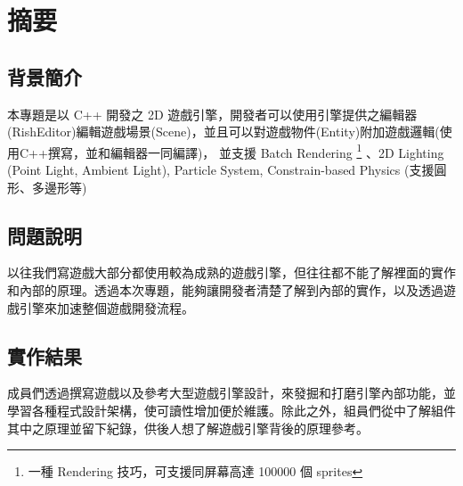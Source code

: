 \chapter{摘要}

\section{背景簡介}

本專題是以 C++ 開發之 2D 遊戲引擎，開發者可以使用引擎提供之編輯器(RishEditor)編輯遊戲場景(Scene)，並且可以對遊戲物件(Entity)附加遊戲邏輯(使用C++撰寫，並和編輯器一同編譯)，
並支援 Batch Rendering \footnote{一種 Rendering 技巧，可支援同屏幕高達 100000 個 sprites} 、2D Lighting (Point Light, Ambient Light), Particle System, Constrain-based Physics (支援圓形、多邊形等)

\section{問題說明}

以往我們寫遊戲大部分都使用較為成熟的遊戲引擎，但往往都不能了解裡面的實作和內部的原理。透過本次專題，能夠讓開發者清楚了解到內部的實作，以及透過遊戲引擎來加速整個遊戲開發流程。

\section{實作結果}

成員們透過撰寫遊戲以及參考大型遊戲引擎設計，來發掘和打磨引擎內部功能，並學習各種程式設計架構，使可讀性增加便於維護。除此之外，組員們從中了解組件其中之原理並留下紀錄，供後人想了解遊戲引擎背後的原理參考。

\newpage